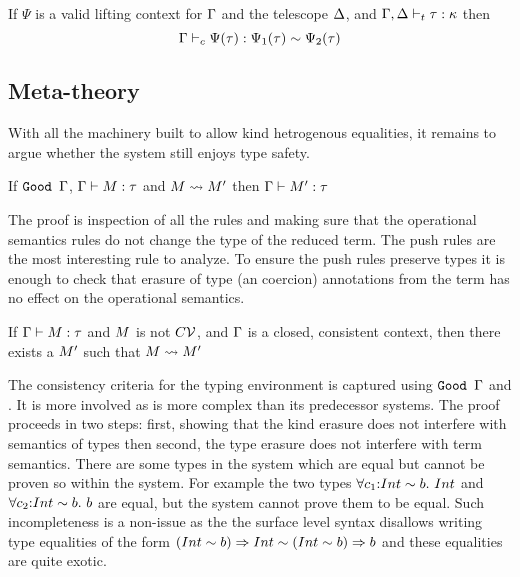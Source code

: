 \documentclass[screen,nonacm,manuscript,review]{acmart} %
\begin{document}
\begin{lemma}\label{lem:sfk-coercion-lifting}
If $\Psi$ is a valid lifting context for $\Gamma$ and the telescope $\Delta$,
and $\Gamma,\Delta \vdash_{t} \tau : \kappa$ then
\[ \Gamma \vdash_{c} \Psi(\tau) : \Psi_1(\tau) \sim \Psi_2(\tau) \]
\end{lemma}


\subsection{Meta-theory}\label{sfk-meta-theory}
With all the machinery built to allow kind hetrogenous equalities, it remains to argue whether
the system still enjoys type safety.

\begin{lemma}\label{lem:sfk-preservation}
If $\texttt{Good~}\Gamma$, $\Gamma \vdash M : \tau$  and $M \rightsquigarrow M'$ then $\Gamma \vdash M' : \tau$
\end{lemma}
The proof is inspection of all the rules and making sure that the operational semantics rules
do not change the type of the reduced term. The push rules are the most interesting rule to analyze.
To ensure the push rules preserve types it is enough to check that erasure of type (an coercion) annotations
from the term has no effect on the operational semantics.

\begin{lemma}\label{lem:sfk-progress}
If $\Gamma \vdash M : \tau$ and $M$ is not $C\mathcal{V}$, and $\Gamma$ is a closed, consistent context, then
there exists a $M'$ such that $M \rightsquigarrow M'$
\end{lemma}

The consistency criteria for the typing environment is captured using $\texttt{Good~}\Gamma$ and \SFC. It is
more involved as \SFK is more complex than its predecessor systems.
The proof proceeds in two steps: first, showing that the kind erasure does not interfere with
semantics of types then second, the type erasure does not interfere with term semantics.
There are some types in the system which are equal but cannot be proven so within the system.
For example the two types $\forall c_1{:} Int \sim b.~Int$ and $\forall c_2{:} Int \sim b.~b$ are equal,
but the system cannot prove them to be equal. Such incompleteness is a non-issue as the the surface level
syntax disallows writing type equalities of the form $(Int \sim b) \Rightarrow Int \sim (Int \sim b) \Rightarrow b$
and these equalities are quite exotic.
\end{document}
